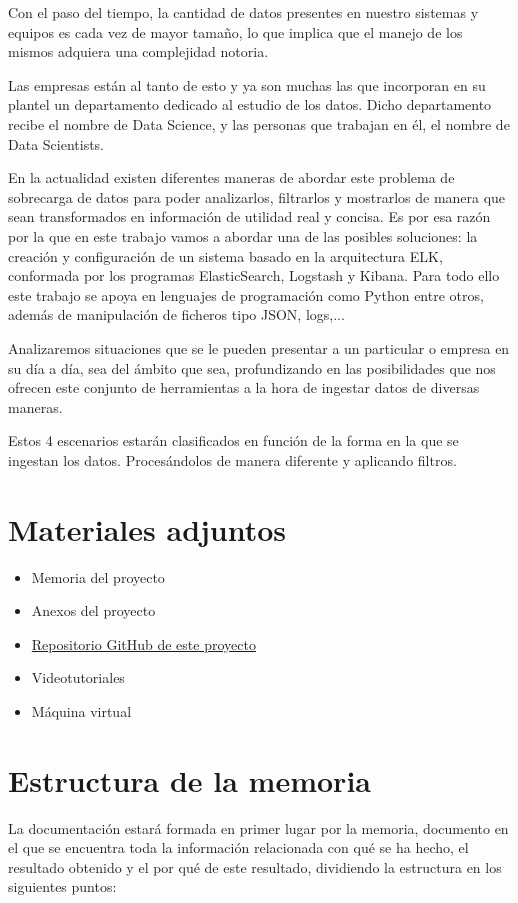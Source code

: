 
Con el paso del tiempo, la cantidad de datos presentes en nuestro sistemas y equipos es cada vez de mayor tamaño, lo que implica que el manejo de los mismos adquiera una complejidad notoria.

Las empresas están al tanto de esto y ya son muchas las que incorporan en su plantel un departamento dedicado al estudio de los datos. Dicho departamento recibe el nombre de Data Science, y las personas que trabajan en él, el nombre de Data Scientists.

En la actualidad existen diferentes maneras de abordar este problema de sobrecarga de datos para poder analizarlos, filtrarlos y mostrarlos de manera que sean transformados en información de utilidad real y concisa.
Es por esa razón por la que en este trabajo vamos a abordar una de las posibles soluciones: la creación y configuración de un sistema basado en la arquitectura ELK, conformada por los programas ElasticSearch, Logstash y Kibana. Para todo ello este trabajo se apoya en lenguajes de programación como Python entre otros, además de manipulación de ficheros tipo JSON, logs,...

Analizaremos situaciones que se le pueden presentar a un particular o empresa en su día a día, sea del ámbito que sea, profundizando en las posibilidades que nos ofrecen este conjunto de herramientas a la hora de ingestar datos de diversas maneras.

Estos 4 escenarios estarán clasificados en función de la forma en la que se ingestan los datos. Procesándolos de manera diferente y aplicando filtros.

\section{Materiales adjuntos}

\begin{itemize}
    \item Memoria del proyecto
    \item Anexos del proyecto
    \item      \href{https://github.com/hds1001/Estudio-y-configuracion-de-un-sistema-ELK}{Repositorio GitHub de este proyecto}
    \item Videotutoriales
    \item Máquina virtual
\end{itemize}

\section{Estructura de la memoria}
La documentación estará formada en primer lugar por la memoria, documento en el que se encuentra toda la información relacionada con qué se ha hecho, el resultado obtenido y el por qué de este resultado, dividiendo la estructura en los siguientes puntos:

